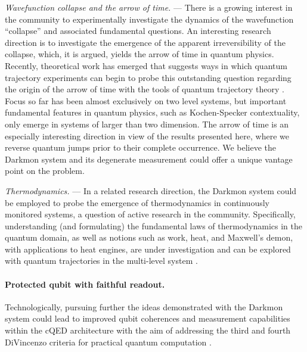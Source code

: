 \emph{Wavefunction collapse and the arrow of time. }— There is a growing
interest in the community to experimentally investigate the dynamics
of the wavefunction ``collapse'' \citep{Katz2006,Katz2008,Murch2013a,Hatridge2013,Weber2014,Campagne-Ibarcq2014,Campagne2016-Fluorescence,Jordan2016-fluorescence,Naghiloo2016,Tan2017,Harrington2017}
and associated fundamental questions. An interesting research direction
is to investigate the emergence of the apparent irreversibility of
the collapse, which, it is argued, yields the arrow of time in quantum
physics. Recently, theoretical work has emerged that suggests ways
in which quantum trajectory experiments can begin to probe this outstanding
question regarding the origin of the arrow of time with the tools
of quantum trajectory theory \citep{Dressel2017-arrow-of-time,Jordan2017-Janus}.
Focus so far has been almost exclusively on two level systems, but
important fundamental features in quantum physics, such as Kochen-Specker
contextuality, only emerge in systems of larger than two dimension.
The arrow of time is an especially interesting direction in view of
the results presented here, where we reverse quantum jumps prior to
their complete occurrence. We believe the Darkmon system and its degenerate
measurement could offer a unique vantage point on the problem. 

\emph{Thermodynamics.} — In a related research direction, the Darkmon
system could be employed to probe the emergence of thermodynamics
in continuously monitored systems, a question of active research in
the community. Specifically, understanding (and formulating) the fundamental
laws of thermodynamics in the quantum domain, as well as notions such
as work, heat, and Maxwell's demon, with applications to heat engines,
are under investigation and can be explored with quantum trajectories
in the multi-level system \citep{Alonso2016-thermo,Naghiloo2017-thermo,Elouard2017,Cottet2017}. 


\paragraph{Protected qubit with faithful readout. }

Technologically, pursuing further the ideas demonstrated with the
Darkmon system could lead to improved qubit coherences and measurement
capabilities within the cQED architecture with the aim of addressing
the third and fourth DiVincenzo criteria for practical quantum computation
\citep{DiVincenzo2000-criteria} . 

